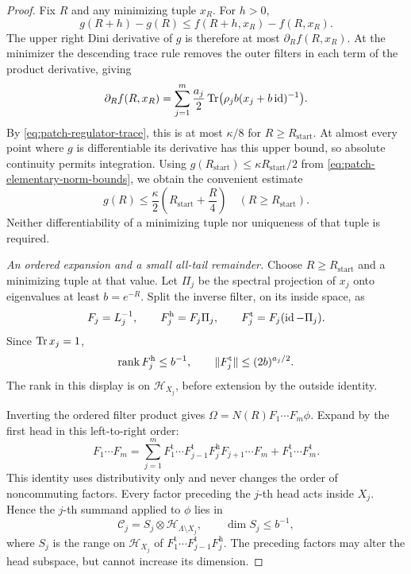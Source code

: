 \begin{proof}
Fix \(R\) and any minimizing tuple \(x_R\).  For \(h>0\),
\[
 g(R+h)-g(R)
       \leq f(R+h,x_R)-f(R,x_R).
\]
The upper right Dini derivative of \(g\) is therefore at most
\(\partial_R f(R,x_R)\).  At the minimizer the descending
trace rule removes the outer filters in each term of the product
derivative, giving
\[
 \partial_R f(R,x_R)
       =\sum_{j=1}^m\frac{a_j}{2}
          \operatorname{Tr}\bigl(\rho_j b(x_j+b\operatorname{id})^{-1}\bigr).
\]
By \eqref{eq:patch-regulator-trace}, this is at most
\(\kappa/8\) for \(R\geq R_{\mathrm{start}}\).
At almost every point where \(g\) is differentiable its derivative
has this upper bound, so absolute continuity permits integration.
Using \(g(R_{\mathrm{start}})\leq
\kappa R_{\mathrm{start}}/2\) from
\eqref{eq:patch-elementary-norm-bounds}, we obtain the convenient
estimate
\begin{equation}
 g(R)\leq\frac{\kappa}{2}
                 \left(R_{\mathrm{start}}+\frac R4\right)
       \quad(R\geq R_{\mathrm{start}}).
 \label{eq:patch-minimum-growth}
\end{equation}
Neither differentiability of a minimizing tuple nor uniqueness of
that tuple is required.

\emph{An ordered expansion and a small all-tail remainder.}
Choose \(R\geq R_{\mathrm{start}}\) and a minimizing tuple at
that value.  Let \(\Pi_j\) be the spectral projection of \(x_j\)
onto eigenvalues at least \(b=e^{-R}\).  Split the inverse filter,
on its inside space, as
\[
 F_j=L_j^{-1},\qquad
 F_j^{\mathrm h}=F_j\Pi_j,\qquad
 F_j^{\mathrm t}=F_j(\operatorname{id}-\Pi_j).
\]
Since \(\operatorname{Tr} x_j=1\),
\begin{equation}
 \operatorname{rank} F_j^{\mathrm h}\leq b^{-1},
 \qquad
 \lVert F_j^{\mathrm t}\rVert\leq(2b)^{a_j/2}.
 \label{eq:patch-head-tail-bounds}
\end{equation}
The rank in this display is on \(\mathcal H_{X_j}\), before
extension by the outside identity.

Inverting the ordered filter product gives
\(\Omega=N(R)F_1\cdots F_m\phi\).
Expand by the first head in this left-to-right order:
\begin{equation}
 F_1\cdots F_m
   =\sum_{j=1}^m
        F_1^{\mathrm t}\cdots F_{j-1}^{\mathrm t}
        F_j^{\mathrm h}F_{j+1}\cdots F_m
      +F_1^{\mathrm t}\cdots F_m^{\mathrm t}.
 \label{eq:patch-first-head-expansion}
\end{equation}
This identity uses distributivity only and never changes the order
of noncommuting factors.  Every factor preceding the \(j\)-th head
acts inside \(X_j\).  Hence the \(j\)-th summand applied to \(\phi\)
lies in
\[
 \mathcal C_j=S_j\otimes\mathcal H_{\Lambda\setminus X_j},
 \qquad
 \dim S_j\leq b^{-1},
\]
where \(S_j\) is the range on \(\mathcal H_{X_j}\) of
\(F_1^{\mathrm t}\cdots F_{j-1}^{\mathrm t}F_j^{\mathrm h}\).
The preceding factors may alter the head subspace, but cannot
increase its dimension.


\end{proof}
